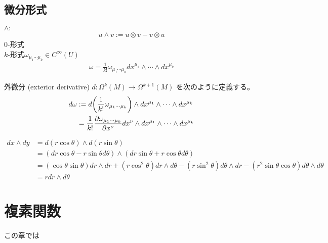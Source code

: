 \documentclass[uplatex,dvipdfmx,a4paper,11pt]{jlreq}
\theoremstyle{definition}
\begin{document}
\subsection{微分形式}
\begin{definition}[微分形式]
  $\land:$
  \begin{align}
    u\land v := u\otimes v - v\otimes u
  \end{align}
  $0$-形式 \\
  $k$-形式$\omega_{\mu_1\cdots\mu_k}\in C^\infty(U)$
  \begin{align}
    \omega = \frac{1}{k!}\omega_{\mu_1\cdots\mu_k}dx^{\mu_1}\land\cdots\land dx^{\mu_k}
  \end{align}
\end{definition}
\begin{definition}[外微分]
  外微分 (exterior derivative) $d: \Omega^k(M)\to\Omega^{k+1}(M)$ を次のように定義する。
  \begin{align}
    d\omega & := d\qty(\frac{1}{k!}\omega_{\mu_1\cdots\mu_k})\land dx^{\mu_1}\land\cdots\land dx^{\mu_k}                \\
            & = \frac{1}{k!}\pdv{\omega_{\mu_1\cdots\mu_k}}{x^{\nu}}dx^{\nu}\land dx^{\mu_1}\land\cdots\land dx^{\mu_k}
  \end{align}
\end{definition}
\begin{align}
  dx\land dy & = d(r\cos\theta)\land d(r\sin\theta)                                                                                                                  \\
             & = (dr\cos\theta - r\sin\theta d\theta)\land (dr\sin\theta + r\cos\theta d\theta)                                                                      \\
             & = (\cos\theta\sin\theta)dr\land dr + (r\cos^2\theta)dr\land d\theta - (r\sin^2\theta) d\theta\land dr - (r^2\sin\theta\cos\theta)d\theta\land d\theta \\
             & = r dr\land d\theta
\end{align}

\begin{definition}
\end{definition}

\begin{theorem}[ストークスの定理]
\end{theorem}

\section{複素関数}
この章では
\end{document}
